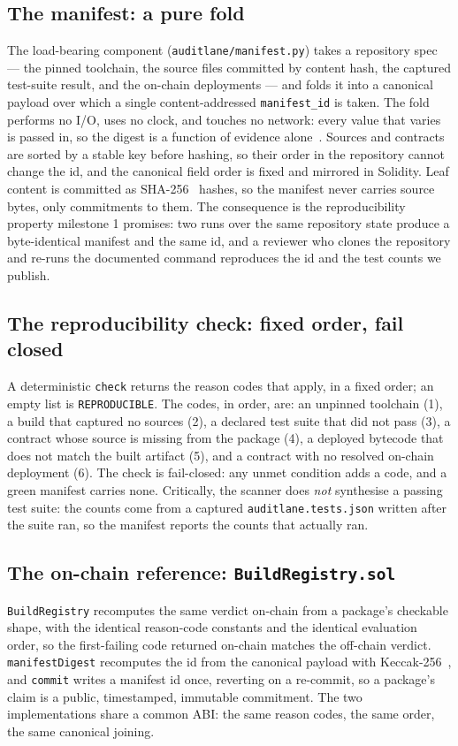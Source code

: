 \documentclass[11pt]{article}
\begin{document}
\subsection{The manifest: a pure fold}
The load-bearing component (\texttt{auditlane/manifest.py}) takes a repository spec ---
the pinned toolchain, the source files committed by content hash, the captured test-suite
result, and the on-chain deployments --- and folds it into a canonical payload over which
a single content-addressed \texttt{manifest\_id} is taken. The fold performs no I/O, uses
no clock, and touches no network: every value that varies is passed in, so the digest is a
function of evidence alone~\cite{reproducible}. Sources and contracts are sorted by a
stable key before hashing, so their order in the repository cannot change the id, and the
canonical field order is fixed and mirrored in Solidity. Leaf content is committed as
SHA-256~\cite{sha2} hashes, so the manifest never carries source bytes, only commitments
to them. The consequence is the reproducibility property milestone 1 promises: two runs
over the same repository state produce a byte-identical manifest and the same id, and a
reviewer who clones the repository and re-runs the documented command reproduces the id
and the test counts we publish.

\subsection{The reproducibility check: fixed order, fail closed}
A deterministic \texttt{check} returns the reason codes that apply, in a fixed order; an
empty list is \texttt{REPRODUCIBLE}. The codes, in order, are: an unpinned toolchain
(1), a build that captured no sources (2), a declared test suite that did not pass (3), a
contract whose source is missing from the package (4), a deployed bytecode that does not
match the built artifact (5), and a contract with no resolved on-chain deployment (6).
The check is fail-closed: any unmet condition adds a code, and a green manifest carries
none. Critically, the scanner does \emph{not} synthesise a passing test suite: the counts
come from a captured \texttt{auditlane.tests.json} written after the suite ran, so the
manifest reports the counts that actually ran.

\subsection{The on-chain reference: \texttt{BuildRegistry.sol}}
\texttt{BuildRegistry} recomputes the same verdict on-chain from a package's checkable
shape, with the identical reason-code constants and the identical evaluation order, so the
first-failing code returned on-chain matches the off-chain verdict. \texttt{manifestDigest}
recomputes the id from the canonical payload with Keccak-256~\cite{keccak}, and
\texttt{commit} writes a manifest id once, reverting on a re-commit, so a package's claim
is a public, timestamped, immutable commitment. The two implementations share a common
ABI: the same reason codes, the same order, the same canonical joining.
\end{document}
